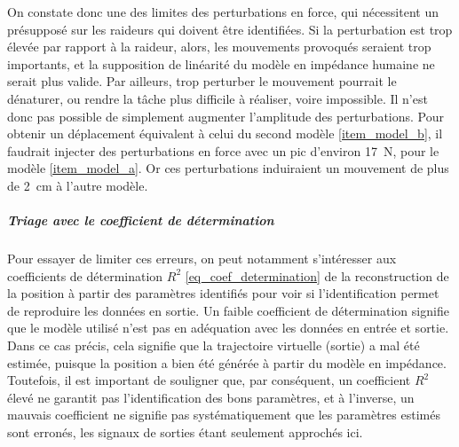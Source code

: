 On constate donc une des limites des perturbations en force, qui nécessitent un présupposé sur les raideurs qui doivent être identifiées. Si la perturbation est trop élevée par rapport à la raideur, alors, les mouvements provoqués seraient trop importants, et la supposition de linéarité du modèle en impédance humaine ne serait plus valide. Par ailleurs, trop perturber le mouvement pourrait le dénaturer, ou rendre la tâche plus difficile à réaliser, voire impossible. Il n'est donc pas possible de simplement augmenter l'amplitude des perturbations. Pour obtenir un déplacement équivalent à celui du second modèle \cref{item_model_b}, il faudrait injecter des perturbations en force avec un pic d'environ \SI{17}{\newton}, pour le modèle \cref{item_model_a}. Or ces perturbations induiraient un mouvement de plus de \SI{2}{\centi\metre} à l'autre modèle.


\subparagraph{Triage avec le coefficient de détermination}

Pour essayer de limiter ces erreurs, on peut notamment s'intéresser aux coefficients de détermination $R^2$ \cref{eq_coef_determination} de la reconstruction de la position à partir des paramètres identifiés pour voir si l'identification permet de reproduire les données en sortie. Un faible coefficient de détermination signifie que le modèle utilisé n'est pas en adéquation avec les données en entrée et sortie. Dans ce cas précis, cela signifie que la trajectoire virtuelle (sortie) a mal été estimée, puisque la position a bien été générée à partir du modèle en impédance. Toutefois, il est important de souligner que, par conséquent, un coefficient $R^2$ élevé ne garantit pas l'identification des bons paramètres, et à l'inverse, un mauvais coefficient ne signifie pas systématiquement que les paramètres estimés sont erronés, les signaux de sorties étant seulement approchés ici.

